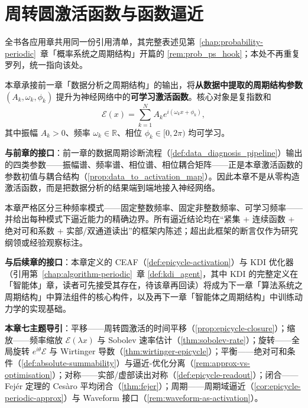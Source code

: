 \chapter{周转圆激活函数与函数逼近}
\label{chap:epicycle-activation}

\begin{remark}[本章目标的周期性判定（引用）]\label{rem:epicycle_act_ps_hook}
全书各应用章共用同一份引用清单，其完整表述见第~\ref{chap:probability-periodic}~章「概率系统之周期结构」开篇的 \cref{rem:prob_ps_hook}；本处不再重复罗列，统一指向该处。
\end{remark}

\begin{remark}\label{rem:epicycle-activation-positioning}
本章承接前一章「数据分析之周期结构」的输出，将\textbf{从数据中提取的周期结构参数} $(A_k,\omega_k,\phi_k)$ 提升为神经网络中的\textbf{可学习激活函数}。核心对象是复指数和
\[
\mathcal E(x)=\sum_{k=1}^{N}A_k e^{i(\omega_k x+\phi_k)},
\]
其中振幅 $A_k>0$、频率 $\omega_k\in\mathbb R$、相位 $\phi_k\in[0,2\pi)$ 均可学习。

\textbf{与前章的接口}：前一章的数据周期诊断流程（\cref{def:data_diagnosis_pipeline}）输出的四类参数——振幅谱、频率谱、相位谱、相位耦合矩阵——正是本章激活函数的参数初值与耦合结构（\cref{prop:data_to_activation_map}）。因此本章不是从零构造激活函数，而是把数据分析的结果端到端地接入神经网络。

本章严格区分三种频率模式——固定整数频率、固定非整数频率、可学习频率——并给出每种模式下逼近能力的精确边界。所有逼近结论均在“紧集 + 连续函数 + 绝对可和系数 + 实部/双通道读出”的框架内陈述；超出此框架的断言仅作为研究纲领或经验观察标注。

\textbf{与后续章的接口}：本章定义的 CEAF（\cref{def:epicycle-activation}）与 KDI 优化器（引用第~\ref{chap:algorithm-periodic}~章 \cref{def:kdi_agent}，其中 KDI 的完整定义在「智能体」章，读者可先接受其存在，待该章再回读）将成为下一章「算法系统之周期结构」中算法组件的核心构件，以及再下一章「智能体之周期结构」中训练动力学的实现基础。

\textbf{本章七主题导引}：平移——周转圆激活的时间平移（\cref{prop:epicycle-closure}）；缩放——频率缩放 $\mathcal E(\lambda x)$ 与 Sobolev 速率估计（\cref{thm:sobolev-rate}）；旋转——全局旋转 $e^{i\theta}\mathcal E$ 与 Wirtinger 导数（\cref{thm:wirtinger-epicycle}）；平衡——绝对可和条件（\cref{def:absolute-summability}）与逼近-优化分离（\cref{rem:approx-vs-optimisation}）；对称——实部/虚部读出对称（\cref{def:epicycle-readout}）；闭合——Fejér 定理的 Cesàro 平均闭合（\cref{thm:fejer}）；周期——周期域逼近（\cref{cor:epicycle-periodic-approx}）与 Waveform 接口（\cref{rem:waveform-as-activation}）。
\end{remark}

